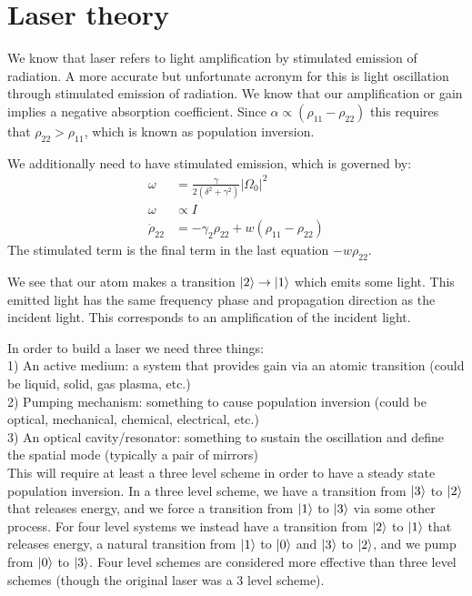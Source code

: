 \section{Laser theory}
We know that laser refers to light amplification by stimulated emission of radiation. A more accurate but unfortunate acronym for this is light oscillation through stimulated emission of radiation.
We know that our amplification or gain implies a negative absorption coefficient. Since $\alpha \propto (\rho_{11} - \rho_{22})$ this requires that $\rho_{22} > \rho_{11}$, which is known as population inversion.

We additionally need to have stimulated emission, which is governed by:
\begin{align*}
	\omega &= \frac{\gamma}{2(\delta^2 +\gamma^2)} |\Omega_0|^2 \\
	\omega &\propto I \\
	\dot{\rho}_{22} &= -\gamma_2 \rho_{22} + w(\rho_{11} - \rho_{22})
\end{align*}
The stimulated term is the final term in the last equation $-w\rho_{22}$.

We see that our atom makes a transition $\ket{2}\to\ket{1}$ which emits some light. This emitted light has the same frequency phase and propagation direction as the incident light.
This corresponds to an amplification of the incident light.

In order to build a laser we need three things:\\
1) An active medium: a system that provides gain via an atomic transition (could be liquid, solid, gas plasma, etc.) \\
2) Pumping mechanism: something to cause population inversion (could be optical, mechanical, chemical, electrical, etc.) \\
3) An optical cavity/resonator: something to sustain the oscillation and define the spatial mode (typically a pair of mirrors) \\

This will require at least a three level scheme in order to have a steady state population inversion.
In a three level scheme, we have a transition from $\ket{3}$ to $\ket{2}$ that releases energy, and we force a transition from $\ket{1}$ to $\ket{3}$ via some other process.
For four level systems we instead have a transition from $\ket{2}$ to $\ket{1}$ that releases energy, a natural transition from $\ket{1}$ to $\ket{0}$ and $\ket{3}$ to $\ket{2}$, and we pump from $\ket{0}$ to $\ket{3}$.
Four level schemes are considered more effective than three level schemes (though the original laser was a 3 level scheme).

